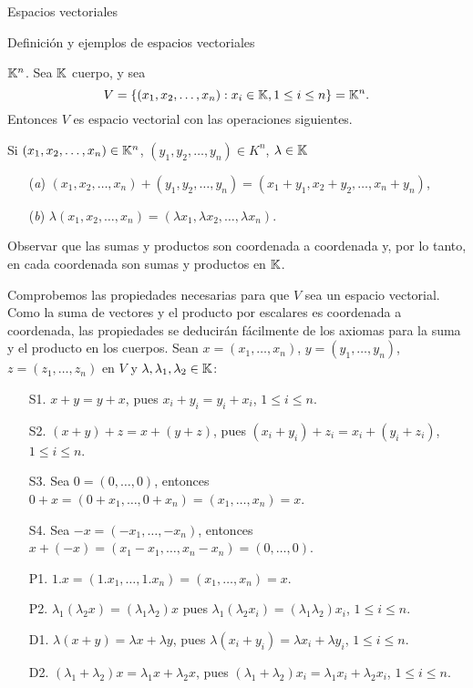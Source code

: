 \begin{chapter}{Espacios vectoriales}
\begin{section}{Definici\'on y ejemplos de espacios vectoriales}
            \begin{ejemplo*} {\textsc{$\mathbb K^n$.}} Sea $\mathbb K$ cuerpo, y sea
                \begin{equation*}
                V = \{(x_1,x_2,\ldots,x_n): x_i \in \mathbb K, 1 \le i \le n \} = \mathbb K^n.
                \end{equation*}	
                Entonces $V$ es espacio vectorial con las operaciones siguientes.
                
                Si $(x_1,x_2,\ldots,x_n) \in \mathbb K^n$, $(y_1,y_2,\ldots,y_n) \in K^n$, $\lambda \in \mathbb K$
                \begin{enumerate}
                    \item[(\textit{a})] $(x_1,x_2,\ldots,x_n)+ (y_1,y_2,\ldots,y_n) = (x_1+y_1,x_2+y_2,\ldots,x_n+y_n)$,
                    \item[(\textit{b})] $\lambda(x_1,x_2,\ldots,x_n) = (\lambda x_1,\lambda x_2,\ldots,\lambda x_n)$.
                \end{enumerate}
                Observar que las sumas y productos son coordenada a coordenada y, por lo tanto, en cada coordenada son sumas y productos en $\mathbb K$.
                
                Comprobemos las propiedades necesarias para que $V$ sea un espacio vectorial. Como la suma de vectores y el producto por escalares es coordenada a coordenada, las propiedades se deducirán fácilmente de los axiomas para la suma y el producto en los cuerpos.  Sean $x =  (x_1,\ldots,x_n)$, $y = (y_1,\ldots,y_n)$, $z = (z_1,\ldots,z_n)$ en $V$ y $\lambda, \lambda_1,\lambda_2 \in \mathbb K$:
                \begin{enumerate}
                    \item[S1.] $x + y = y +x$, pues $x_i + y_i = y_i + x_i$, $1 \le i \le n$.
                    \item[S2.]  $(x+ y)+ z = x + (y+z)$,  pues $(x_i + y_i) + z_i = x_i + (y_i + z_i)$, $1 \le i \le n$. 
                    \item[S3.] Sea $0 = (0,\ldots,0)$,  entonces $0+x = (0+x_1,\ldots, 0+x_n) =(x_1,\ldots,x_n) =x$.
                    \item[S4.] Sea $-x = (-x_1,\ldots,-x_n)$,  entonces $x + (-x) = (x_1-x_1,\ldots,x_n-x_n) =  (0,\ldots,0)$.
                    \item[P1.] $1.x=(1.x_1,\ldots,1.x_n) = (x_1,\ldots,x_n)=x$.
                    \item[P2.] $\lambda_1(\lambda_2x) = (\lambda_1\lambda_2)x$ pues $\lambda_1(\lambda_2x_i) =(\lambda_1\lambda_2)x_i$, $1 \le i \le n$.
                    \item[D1.] $\lambda(x+y) = \lambda x +\lambda y$,  pues $\lambda(x_i+y_i) = \lambda x_i + \lambda y_i$, $1 \le i \le n$.
                    \item[D2.] $(\lambda_1+\lambda_2)x = \lambda_1x + \lambda_2 x$, pues $ (\lambda_1+\lambda_2)x_i = \lambda_1x_i + \lambda_2 x_i$, $1 \le i \le n$.
                \end{enumerate} 
                

\end{ejemplo*}
\end{section}
\end{chapter}
